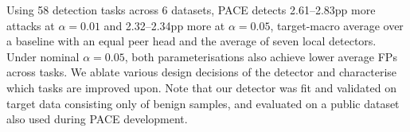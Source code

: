 Using 58 detection tasks across 6 datasets, PACE detects 2.61--2.83pp more attacks at $\alpha=0.01$ and 2.32--2.34pp more at $\alpha=0.05$, target-macro average over a baseline with an equal peer head and the average of seven local detectors. Under nominal $\alpha=0.05$, both parameterisations also achieve lower average FPs across tasks. We ablate various design decisions of the detector and characterise which tasks are improved upon. Note that our detector was fit and validated on target data consisting only of benign samples, and evaluated on a public dataset also used during PACE development.